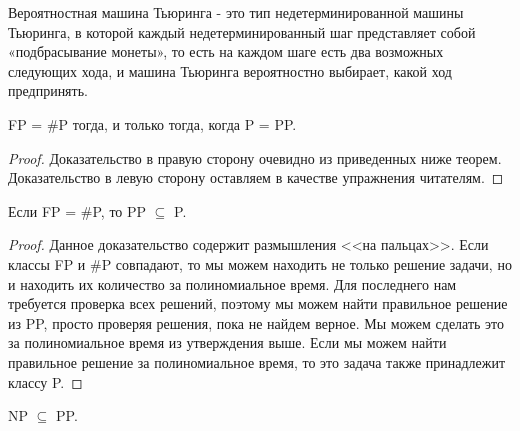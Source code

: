     \begin{Def}
        Вероятностная машина Тьюринга - это тип недетерминированной машины Тьюринга, в которой каждый недетерминированный шаг представляет собой «подбрасывание монеты», то есть на каждом шаге есть два возможных следующих хода, и машина Тьюринга вероятностно выбирает, какой ход предпринять. 
    \end{Def}

    
    \begin{Thm}
         FP = \#P тогда, и только тогда, когда P = PP.
    \end{Thm}
    
    \begin{proof}
        Доказательство в правую сторону очевидно из приведенных ниже теорем.\\
        Доказательство в левую сторону оставляем в качестве упражнения читателям.
    \end{proof}
    
    \begin{Thm}
        Если FP = \#P, то PP $\subseteq$ P.
    \end{Thm}
    
    \begin{proof}
        Данное доказательство содержит размышления <<на пальцах>>. Если классы FP и \#P совпадают, то мы можем находить не только решение задачи, но и находить их количество за полиномиальное время. Для последнего нам требуется проверка всех решений, поэтому мы можем найти правильное решение из PP, просто проверяя решения, пока не найдем верное. Мы можем сделать это за полиномиальное время из утверждения выше. Если мы можем найти правильное решение за полиномиальное время, то это задача также принадлежит классу P.
    \end{proof}
    
    
    \begin{Thm}
        NP $\subseteq$ PP.
    \end{Thm}
    
